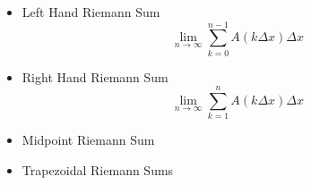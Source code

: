 \documentclass{article}
\begin{document}
\begin{enumerate}
    \begin{itemize}
    \item Left Hand Riemann Sum
$$
\lim_{n\to\infty} \sum_{k=0} ^{n-1} A(k\Delta x)\Delta x 
$$
    \item Right Hand Riemann Sum 
$$
\lim_{n\to\infty} \sum_{k=1} ^{n} A(k\Delta x)\Delta x 
$$

    \item Midpoint Riemann Sum 
    \item Trapezoidal Riemann Sums
  \end{itemize}
  


\end{enumerate}
\end{document}
